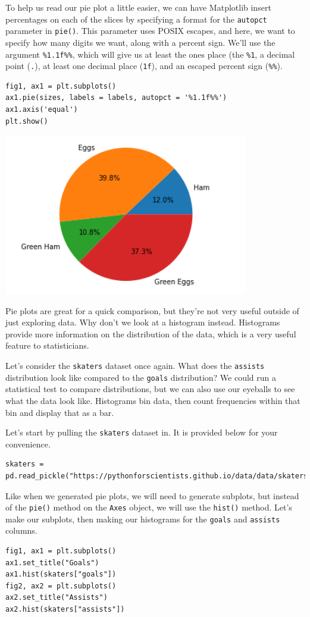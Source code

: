 To help us read our pie plot a little easier, we can have Matplotlib insert percentages on each of the slices by specifying a format for the \verb|autopct| parameter in \verb|pie()|. This parameter uses POSIX escapes, and here, we want to specify how many digits we want, along with a percent sign. We'll use the argument \verb|%1.1f%%|, which will give us at least the ones place (the \verb|%1|, a decimal point (\verb|.|), at least one decimal place (\verb|1f|), and an escaped percent sign (\verb|%%|).

\begin{lstlisting}[style=pippython]
fig1, ax1 = plt.subplots()
ax1.pie(sizes, labels = labels, autopct = '%1.1f%%')
ax1.axis('equal')
plt.show()
\end{lstlisting}

\includegraphics[width=0.8\textwidth]{img/pie2.png}

Pie plots are great for a quick comparison, but they're not very useful outside of just exploring data. Why don't we look at a histogram instead. Histograms provide more information on the distribution of the data, which is a very useful feature to statisticians.\par
Let's consider the \verb|skaters| dataset once again. What does the \verb|assists| distribution look like compared to the \verb|goals| distribution? We could run a statistical test to compare distributions, but we can also use our eyeballs to see what the data look like. Histograms bin data, then count frequencies within that bin and display that as a bar.\par
Let's start by pulling the \verb|skaters| dataset in. It is provided below for your convenience.\par
\begin{lstlisting}[style=pippython]
skaters = pd.read_pickle("https://pythonforscientists.github.io/data/data/skaters.pkl")
\end{lstlisting}
Like when we generated pie plots, we will need to generate subplots, but instead of the \verb|pie()| method on the \verb|Axes| object, we will use the \verb|hist()| method. Let's make our subplots, then making our histograms for the \verb|goals| and \verb|assists| columns.\par
\begin{lstlisting}[style=pippython]
fig1, ax1 = plt.subplots()
ax1.set_title("Goals")
ax1.hist(skaters["goals"])
fig2, ax2 = plt.subplots()
ax2.set_title("Assists")
ax2.hist(skaters["assists"])
\end{lstlisting}

